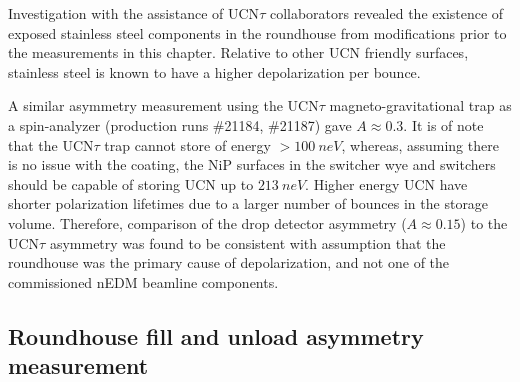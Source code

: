 Investigation with the assistance of UCN$\tau$ collaborators revealed the existence of exposed stainless steel components in the roundhouse from modifications prior to the measurements in this chapter. Relative to other UCN friendly surfaces, stainless steel is known to have a higher depolarization per bounce. 

A similar asymmetry measurement using the UCN$\tau$ magneto-gravitational trap as a spin-analyzer (production runs \#21184, \#21187) gave $A\approx 0.3$. It is of note that the UCN$\tau$ trap cannot store \ucn of energy $>\qty{100}{neV}$, whereas, assuming there is no issue with the coating, the NiP surfaces in the switcher wye and switchers should be capable of storing UCN up to $\qty{213}{neV}$. Higher energy UCN have shorter polarization lifetimes due to a larger number of bounces in the storage volume. Therefore, comparison of the drop detector asymmetry ($A\approx 0.15$) to the UCN$\tau$ asymmetry was found to be consistent with assumption that the roundhouse was the primary cause of depolarization, and not one of the commissioned nEDM beamline components.



\subsection{Roundhouse fill and unload asymmetry measurement}


